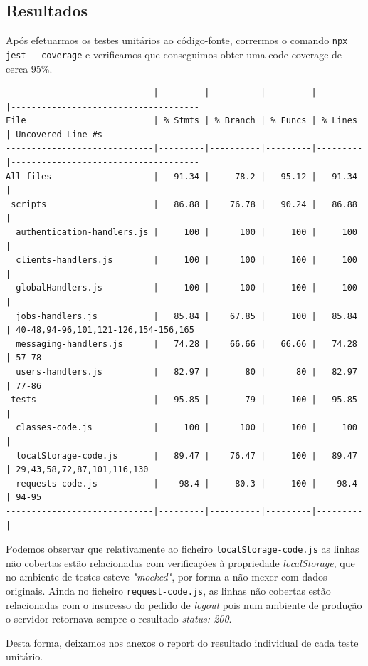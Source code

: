 \documentclass[a4paper,12pt]{article} %
\begin{document}
\newpage
\subsection{Resultados}
Após efetuarmos os testes unitários ao código-fonte, corrermos o comando \verb"npx jest --coverage" e verificamos que conseguimos obter uma code coverage de cerca 95\%.

\scriptsize
\begin{verbatim}
-----------------------------|---------|----------|---------|---------|-------------------------------------
File                         | % Stmts | % Branch | % Funcs | % Lines | Uncovered Line #s
-----------------------------|---------|----------|---------|---------|-------------------------------------
All files                    |   91.34 |     78.2 |   95.12 |   91.34 |
 scripts                     |   86.88 |    76.78 |   90.24 |   86.88 |
  authentication-handlers.js |     100 |      100 |     100 |     100 |
  clients-handlers.js        |     100 |      100 |     100 |     100 |
  globalHandlers.js          |     100 |      100 |     100 |     100 |
  jobs-handlers.js           |   85.84 |    67.85 |     100 |   85.84 | 40-48,94-96,101,121-126,154-156,165
  messaging-handlers.js      |   74.28 |    66.66 |   66.66 |   74.28 | 57-78
  users-handlers.js          |   82.97 |       80 |      80 |   82.97 | 77-86
 tests                       |   95.85 |       79 |     100 |   95.85 |
  classes-code.js            |     100 |      100 |     100 |     100 |
  localStorage-code.js       |   89.47 |    76.47 |     100 |   89.47 | 29,43,58,72,87,101,116,130
  requests-code.js           |    98.4 |     80.3 |     100 |    98.4 | 94-95
-----------------------------|---------|----------|---------|---------|-------------------------------------
\end{verbatim}
\normalsize

Podemos observar que relativamente ao ficheiro \verb"localStorage-code.js" as linhas não cobertas estão relacionadas com verificações à propriedade \textit{localStorage}, que no ambiente de testes esteve \textit{"mocked"}, por forma a não mexer com dados originais. Ainda no ficheiro \verb"request-code.js", as linhas não cobertas estão relacionadas com o insucesso do pedido de \textit{logout} pois num ambiente de produção o servidor retornava sempre o resultado \textit{status: 200}.

Desta forma, deixamos nos anexos o report do resultado individual de cada teste unitário.
\end{document}
